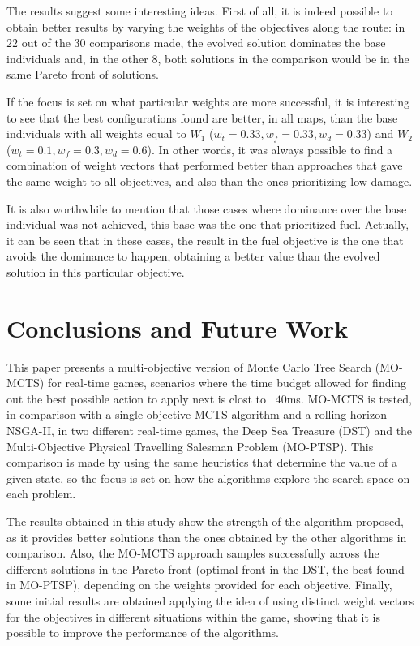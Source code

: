 \documentclass[journal]{IEEEtran}
\begin{document}
The results suggest some interesting ideas. First of all, it is indeed possible to obtain better results by varying the weights of the objectives along the route: in $22$ out of the $30$ comparisons made, the evolved solution dominates the base individuals and, in the other $8$, both solutions in the comparison would be in the same Pareto front of solutions. 

If the focus is set on what particular weights are more successful, it is interesting to see that the best configurations found are better, in all maps, than the base individuals with all weights equal to $W_1$ ($w_t = 0.33, w_f = 0.33, w_d = 0.33$) and $W_2$ ($w_t = 0.1, w_f = 0.3, w_d = 0.6$). In other words, it was always possible to find a combination of weight vectors that performed better than approaches that gave the same weight to all objectives, and also than the ones prioritizing low damage.

It is also worthwhile to mention that those cases where dominance over the base individual was not achieved, this base was the one that prioritized fuel. Actually, it can be seen that in these cases, the result in the fuel objective is the one that avoids the dominance to happen, obtaining a better value than the evolved solution in this particular objective.


\section{Conclusions and Future Work} \label{sec:conc}

This paper presents a multi-objective version of Monte Carlo Tree Search (MO-MCTS) for real-time games, scenarios where the time budget allowed for finding out the best possible action to apply next is clost to ~$40$ms. MO-MCTS is tested, in comparison with a single-objective MCTS algorithm and a rolling horizon NSGA-II, in two different real-time games, the Deep Sea Treasure (DST) and the Multi-Objective Physical Travelling Salesman Problem (MO-PTSP). This comparison is made by using the same heuristics that determine the value of a given state, so the focus is set on how the algorithms explore the search space on each problem.

The results obtained in this study show the strength of the algorithm proposed, as it provides better solutions than the ones obtained by the other algorithms in comparison. Also, the MO-MCTS approach samples successfully across the different solutions in the Pareto front (optimal front in the DST, the best found in MO-PTSP), depending on the weights provided for each objective. Finally, some initial results are obtained applying the idea of using distinct weight vectors for the objectives in different situations within the game, showing that it is possible to improve the performance of the algorithms.
\end{document}
